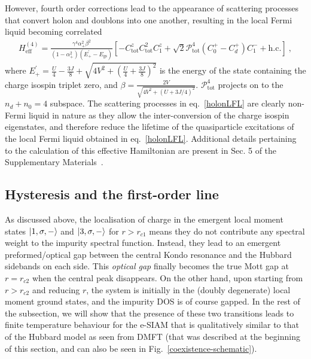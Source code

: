 \documentclass{iopart}
\begin{document}
However, fourth order corrections lead to the appearance of scattering processes that convert holon and doublons into one another, resulting in the local Fermi liquid becoming correlated
\begin{eqnarray}
	H_\text{eff}^{(4)} = \frac{\gamma^4 \alpha_+^2 \beta^2}{\left( 1 - \alpha_+^2 \right) \left( E_+^\prime - E_\text{gs} \right) } \left[- C_\text{tot}^z C_\text{tot}^2 C_1^z + \sqrt{2}\mathcal{P}_\text{tot}^{4}\left(C_0^+ - C_d^+\right)C_1^- + \text{h.c.}\right]~,\label{holonLFL}
\end{eqnarray}
where \(E_+^\prime = \frac{U}{4} - \frac{3J}{8} + \sqrt{4V^2 + \left(\frac{U}{4} + \frac{3J}{8}\right)^2}\) is the energy of the state containing the charge isospin triplet zero, and \(\beta = \frac{2V}{\sqrt{4V^2 + \left(U + 3J/4\right)^2}}\). \(\mathcal{P}^4_\text{tot}\) projects on to the \(n_d + n_0 = 4\) subspace.
The scattering processes in eq.~\eqref{holonLFL} are clearly non-Fermi liquid in nature as they allow the inter-conversion of the charge isospin eigenstates, and therefore reduce the lifetime of the quasiparticle excitations of the local Fermi liquid obtained in eq.~\eqref{holonLFL}. Additional details pertaining to the calculation of this effective Hamiltonian are present in Sec. 5 of the Supplementary Materials~\cite{supp_mat}.


\subsection{Hysteresis and the first-order line}

As discussed above, the localisation of charge in the emergent local moment states \(\ket{1,\sigma,-}\) and \(\ket{3,\sigma,-}\) for \(r > r_{c1}\) means they do not contribute any spectral weight to the impurity spectral function. Instead, they lead to an emergent preformed/optical gap between the central Kondo resonance and the Hubbard sidebands on each side. This {\it optical gap} finally becomes the true Mott gap at \(r = r_{c2}\) when the central peak disappears.
On the other hand, upon starting from \(r > r_{c2}\) and reducing \(r\), the system is initially in the (doubly degenerate) local moment ground states, and the impurity DOS is of course gapped. In the rest of the subsection, we will show that the presence of these two transitions leads to finite temperature behaviour for the e-SIAM that is qualitatively similar to that of the Hubbard model as seen from DMFT (that was described at the beginning of this section, and can also be seen in Fig.~\ref{coexistence-schematic}).
\end{document}
